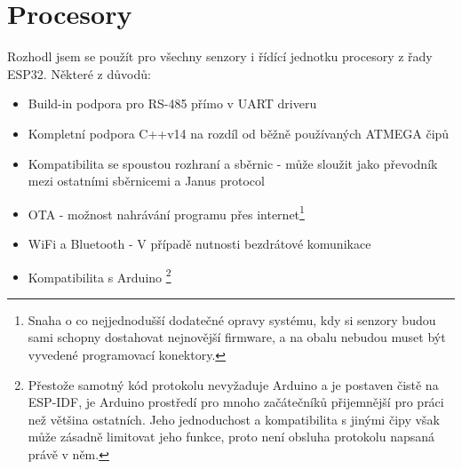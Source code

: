 \section{Procesory}

Rozhodl jsem se použít pro všechny senzory i řídící jednotku procesory z řady ESP32.
Některé z důvodů:
\begin{itemize}
    \item Build-in podpora pro RS-485 přímo v UART driveru
    \item Kompletní podpora C++v14 na rozdíl od běžně používaných ATMEGA čipů
    \item Kompatibilita se spoustou rozhraní a sběrnic - může sloužit jako převodník mezi ostatními sběrnicemi a Janus protocol
    \item OTA - možnost nahrávání programu přes internet\footnote{Snaha o co nejjednodušší dodatečné opravy systému, kdy si senzory budou sami schopny dostahovat nejnovější firmware, a na obalu nebudou muset být vyvedené programovací konektory.}
    \item WiFi a Bluetooth - V případě nutnosti bezdrátové komunikace
    \item Kompatibilita s Arduino \footnote{Přestože samotný kód protokolu nevyžaduje Arduino a je postaven čistě na ESP-IDF, je Arduino prostředí pro mnoho začátečníků přijemnější pro práci než většina ostatních. Jeho jednoduchost a kompatibilita s jinými čipy však může zásadně limitovat jeho funkce, proto není obsluha protokolu napsaná právě v něm.}
\end{itemize}